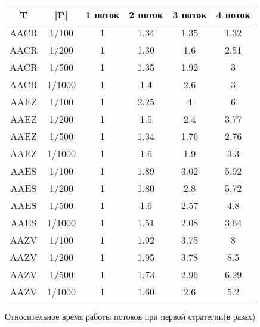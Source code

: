 \documentclass[14pt]{article}
\begin{document}
\begin{figure}
\begin{center}
\begin{tabular}{ | c | c | c | c | c | c |}
        \hline T & |P| & 1 поток & 2 поток & 3 поток & 4 поток\\
        \hline AACR & 1/100 & 1 & 1.34 & 1.35 & 1.32\\
        \hline AACR & 1/200 & 1 & 1.30 & 1.6 & 2.51 \\
        \hline AACR & 1/500 & 1 & 1.35 & 1.92 & 3 \\
 		\hline AACR & 1/1000 & 1 & 1.4 & 2.6 & 3 \\
              
        \hline AAEZ & 1/100 & 1 & 2.25 & 4 & 6 \\
        \hline AAEZ & 1/200 & 1 & 1.5 & 2.4 & 3.77 \\
        \hline AAEZ & 1/500 & 1 & 1.34 & 1.76 & 2.76 \\
        \hline AAEZ & 1/1000 & 1 & 1.6 & 1.9 & 3.3\\
        
  		\hline AAES & 1/100 & 1 & 1.89 & 3.02 & 5.92 \\
        \hline AAES & 1/200 & 1 & 1.80 & 2.8 & 5.72 \\
        \hline AAES & 1/500 & 1 & 1.6 & 2.57 & 4.8 \\
        \hline AAES & 1/1000 & 1 & 1.51 & 2.08 & 3.64 \\
     
  		\hline AAZV & 1/100 & 1 & 1.92 & 3.75 & 8 \\
        \hline AAZV & 1/200 & 1 & 1.95 & 3.78 & 8.5 \\
        \hline AAZV & 1/500 & 1 & 1.73 & 2.96 & 6.29 \\
        \hline AAZV & 1/1000 & 1 & 1.60 & 2.6 & 5.2 \\
     
		\hline
    \end{tabular}
        \end{center}
    \caption{Относительное время работы потоков при первой стратегии(в разах)}
    \label{typical_research}
\end{figure}
\end{document}
